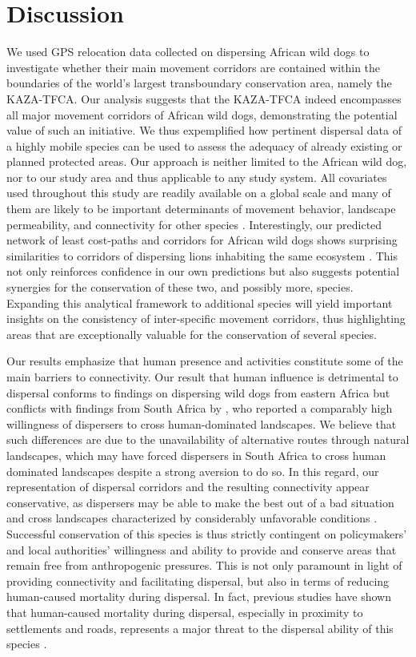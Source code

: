 \documentclass[abstract=on,10pt,a4paper,bibliography=totocnumbered]{article}
\begin{document}
\section{Discussion}
We used GPS relocation data collected on dispersing African wild dogs to
investigate whether their main movement corridors are contained within the
boundaries of the world's largest transboundary conservation area, namely the
KAZA-TFCA. Our analysis suggests that the KAZA-TFCA indeed encompasses all major
movement corridors of African wild dogs, demonstrating the potential value of
such an initiative. We thus expemplified how pertinent dispersal data of a
highly mobile species can be used to assess the adequacy of already existing or
planned protected areas. Our approach is neither limited to the African wild
dog, nor to our study area and thus applicable to any study system. All
covariates used throughout this study are readily available on a global scale
and many of them are likely to be important determinants of movement behavior,
landscape permeability, and connectivity for other species
\citep{Thurfjell.2014, Zeller.2012}. Interestingly, our predicted network of
least cost-paths and corridors for African wild dogs shows surprising
similarities to corridors of dispersing lions inhabiting the same ecosystem
\citep{Elliot.2014, Cushman.2018}. This not only reinforces confidence in our
own predictions but also suggests potential synergies for the conservation of
these two, and possibly more, species. Expanding this analytical framework to
additional species will yield important insights on the consistency of
inter-specific movement corridors, thus highlighting areas that are
exceptionally valuable for the conservation of several species.

Our results emphasize that human presence and activities constitute some of the
main barriers to connectivity. Our result that human influence is detrimental to
dispersal conforms to findings on dispersing wild dogs from eastern Africa
\citep{Masenga.2016, Oneill.2020} but conflicts with findings from South Africa
by \cite{DaviesMostert.2012}, who reported a comparably high willingness of
dispersers to cross human-dominated landscapes. We believe that such differences
are due to the unavailability of alternative routes through natural landscapes,
which may have forced dispersers in South Africa to cross human dominated
landscapes despite a strong aversion to do so. In this regard, our
representation of dispersal corridors and the resulting connectivity appear
conservative, as dispersers may be able to make the best out of a bad situation
and cross landscapes characterized by considerably unfavorable conditions
\citep{Palomares.2000, Elliot.2014}. Successful conservation of this species is
thus strictly contingent on policymakers' and local authorities' willingness and
ability to provide and conserve areas that remain free from anthropogenic
pressures. This is not only paramount in light of providing connectivity and
facilitating dispersal, but also in terms of reducing human-caused mortality
during dispersal. In fact, previous studies have shown that human-caused
mortality during dispersal, especially in proximity to settlements and roads,
represents a major threat to the dispersal ability of this species
\citep{Woodroffe.2019, Cozzi.2020}.
\end{document}
